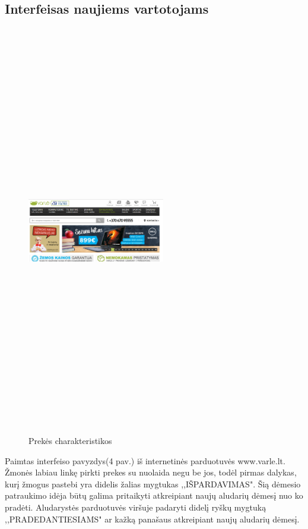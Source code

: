 \documentclass[oneside]{VUMIFPSkursinis}
\begin{document}
	\subsection{Interfeisas naujiems vartotojams}
		\begin{figure}[h]
			\centering
			\includegraphics[width=6cm,height=18cm,keepaspectratio]{IkvepiantisInterfeisas4.png}
			\caption{ Prekės charakteristikos}
		\end{figure}
	
			Paimtas interfeiso pavyzdys(4 pav.) iš internetinės parduotuvės www.varle.lt. 
			Žmonės labiau linkę pirkti prekes su nuolaida negu be jos, todėl pirmas dalykas, kurį žmogus pastebi yra didelis žalias mygtukas ,,IŠPARDAVIMAS". 
			Šią dėmesio patraukimo idėja būtų galima pritaikyti atkreipiant naujų aludarių dėmesį nuo ko pradėti. 
			Aludarystės parduotuvės viršuje padaryti didelį ryškų mygtuką ,,PRADEDANTIESIAMS" ar kažką panašaus atkreipiant naujų aludarių dėmesį.
\end{document}
